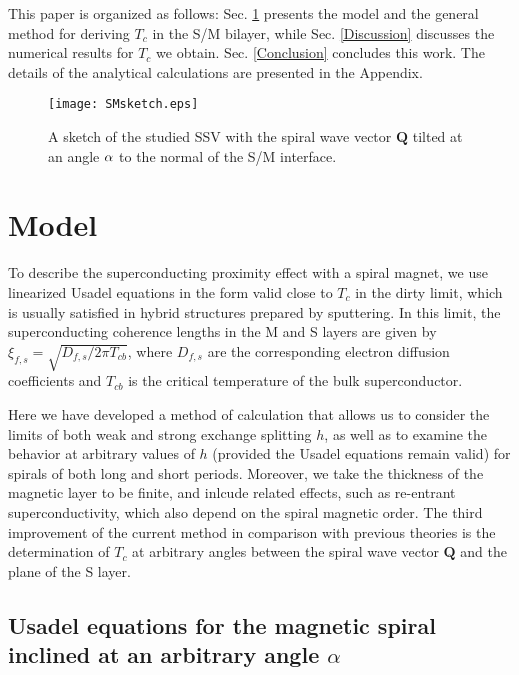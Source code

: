\documentclass[prb,amsmath,amssymb,reprint]{revtex4-2}
\begin{document}
This paper is organized as follows: Sec. \ref{Model} presents the model and the general method for deriving $T_c$ in the S/M bilayer, while Sec. \ref{Discussion} discusses the numerical results for $T_c$ we obtain. Sec. \ref{Conclusion} concludes this work. The details of the analytical calculations are presented in the Appendix.

\begin{figure}[t]
\begin{center}
\texttt{[image: SMsketch.eps]}
\end{center}
\caption{A sketch of the studied SSV with the spiral wave vector $%
\mathbf{Q}$ tilted at an angle $\protect\alpha$ to the normal of the S/M interface.}
\label{Sketch}
\end{figure}

\section{Model}

\label{Model}

To describe the superconducting proximity effect with a spiral
magnet, we use linearized Usadel equations in the form \cite%
{Champel2005} valid close to $T_{c}$ in the dirty limit, which is usually satisfied
in hybrid structures prepared by sputtering. In this limit, the
superconducting coherence lengths in the M and S layers are given by $\xi
_{f,s}=\sqrt{D_{f,s}/2\pi T_{cb}}$, where $D_{f,s}$ are the corresponding
electron diffusion coefficients and $T_{cb}$ is the critical temperature of
the bulk superconductor.

Here we have developed a method of  calculation that  allows us to consider the  limits of both weak and strong exchange splitting $h$, as well as to examine the behavior at arbitrary values of $h$ (provided the Usadel equations remain valid) for  spirals of both long and short periods. Moreover, we take the  thickness of the magnetic layer to be finite, and inlcude related effects, such as re-entrant superconductivity, which also depend on the spiral magnetic order. The third improvement of the current method in comparison with previous theories \cite{Champel2005,VolkovAnishchanka,Halasz2009,Halasz2011,Wu2012,USA2014,Halterman2016,Pugach2017} is the determination of $T_c$ at arbitrary angles between the spiral wave vector $\mathbf{Q}$ and the plane of the S layer.


\subsection{Usadel equations for the magnetic spiral inclined at an arbitrary
angle $\alpha$}
\end{document}
